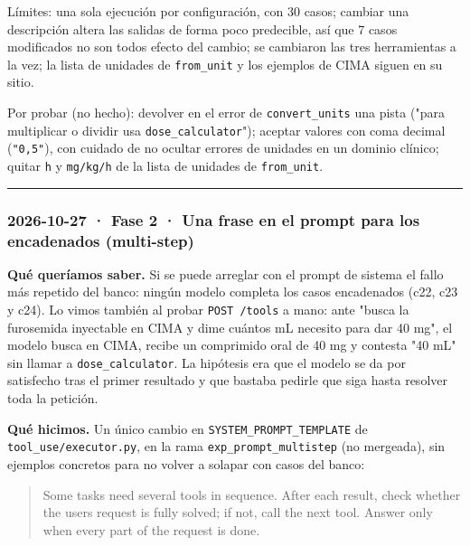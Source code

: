 Límites: una sola ejecución por configuración, con 30 casos; cambiar una descripción altera las
salidas de forma poco predecible, así que 7 casos modificados no son todos efecto del cambio; se
cambiaron las tres herramientas a la vez; la lista de unidades de \texttt{from\_\allowbreak{}unit} y los ejemplos de CIMA
siguen en su sitio.

Por probar (no hecho): devolver en el error de \texttt{convert\_\allowbreak{}units} una pista ("para multiplicar o
dividir usa \texttt{dose\_\allowbreak{}calculator}"); aceptar valores con coma decimal (\texttt{"0,5"}), con cuidado de no
ocultar errores de unidades en un dominio clínico; quitar \texttt{\textquotesingle{}h\textquotesingle{}} y \texttt{\textquotesingle{}mg/\allowbreak{}kg/\allowbreak{}h\textquotesingle{}} de la lista de
unidades de \texttt{from\_\allowbreak{}unit}.

\begin{center}\rule{0.5\linewidth}{0.5pt}\end{center}

\subsubsection{2026-10-27 · Fase 2 · Una frase en el prompt para los encadenados (multi-step)}

\textbf{Qué queríamos saber.} Si se puede arreglar con el prompt de sistema el fallo más repetido del
banco: ningún modelo completa los casos encadenados (c22, c23 y c24). Lo vimos también al probar
\texttt{POST /\allowbreak{}tools} a mano: ante "busca la furosemida inyectable en CIMA y dime cuántos mL necesito para
dar 40 mg", el modelo busca en CIMA, recibe un comprimido oral de 40 mg y contesta "40 mL" sin llamar a
\texttt{dose\_\allowbreak{}calculator}. La hipótesis era que el modelo se da por satisfecho tras el primer resultado y que
bastaba pedirle que siga hasta resolver toda la petición.

\textbf{Qué hicimos.} Un único cambio en \texttt{SYSTEM\_\allowbreak{}PROMPT\_\allowbreak{}TEMPLATE} de \texttt{tool\_\allowbreak{}use/\allowbreak{}executor.py}, en la rama
\texttt{exp\_\allowbreak{}prompt\_\allowbreak{}multistep} (no mergeada), sin ejemplos concretos para no volver a solapar con casos del
banco:

\begin{quote}
Some tasks need several tools in sequence. After each result, check whether the user\textquotesingle s request
is fully solved; if not, call the next tool. Answer only when every part of the request is done.
\end{quote}

